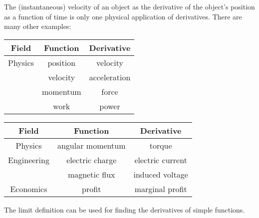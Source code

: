 The (instantaneous) velocity of an object as the derivative of the object's
position as a function of time is only one physical application of derivatives.
There are many other examples:

\begin{center}
 \small{\begin{tabular}{|c|c|c|}
 \hline
 \rowcolor{fillcolor} Field & Function & Derivative\\
 \hline
 Physics & position & velocity\\
 {} & velocity & acceleration\\
 {} & momentum & force\\
 {} & work & power\\
 \hline
 \end{tabular}
 \begin{tabular}{|c|c|c|}
 \hline
 \rowcolor{fillcolor} Field & Function & Derivative\\
 \hline
 Physics & angular momentum & torque\\
\hline
 Engineering & electric charge & electric current\\
 {} & magnetic flux & induced voltage\\
 \hline
 Economics & profit & marginal profit\\
 \hline
 \end{tabular}}
\end{center}\vspace{2mm}

The limit definition can be used for finding the derivatives of simple functions.

